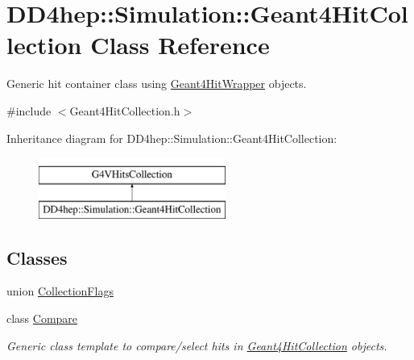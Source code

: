 \hypertarget{class_d_d4hep_1_1_simulation_1_1_geant4_hit_collection}{}\section{D\+D4hep\+:\+:Simulation\+:\+:Geant4\+Hit\+Collection Class Reference}
\label{class_d_d4hep_1_1_simulation_1_1_geant4_hit_collection}


Generic hit container class using \hyperlink{class_d_d4hep_1_1_simulation_1_1_geant4_hit_wrapper}{Geant4\+Hit\+Wrapper} objects.  




{\ttfamily \#include $<$Geant4\+Hit\+Collection.\+h$>$}

Inheritance diagram for D\+D4hep\+:\+:Simulation\+:\+:Geant4\+Hit\+Collection\+:\begin{figure}[H]
\begin{center}
\leavevmode
\includegraphics[height=2.000000cm]{class_d_d4hep_1_1_simulation_1_1_geant4_hit_collection}
\end{center}
\end{figure}
\subsection*{Classes}
\begin{DoxyCompactItemize}
\item 
union \hyperlink{union_d_d4hep_1_1_simulation_1_1_geant4_hit_collection_1_1_collection_flags}{Collection\+Flags}
\item 
class \hyperlink{class_d_d4hep_1_1_simulation_1_1_geant4_hit_collection_1_1_compare}{Compare}
\begin{DoxyCompactList}\small\item\em Generic class template to compare/select hits in \hyperlink{class_d_d4hep_1_1_simulation_1_1_geant4_hit_collection}{Geant4\+Hit\+Collection} objects. \end{DoxyCompactList}\end{DoxyCompactItemize}
